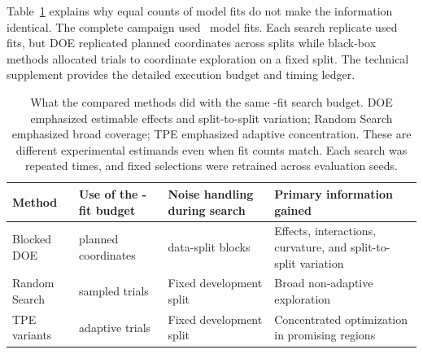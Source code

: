 \documentclass[12pt,a4paper]{article}
\begin{document}
Table~\ref{tab:methods} explains why equal counts of model fits do not make the information identical. The complete campaign used \numRevTotalFits\ model fits. Each search replicate used \numPubSearchFits{} fits, but DOE replicated planned coordinates across splits while black-box methods allocated trials to coordinate exploration on a fixed split. The technical supplement provides the detailed execution budget and timing ledger.
\begin{table}[H]
\centering
\small
\setlength{\tabcolsep}{5pt}
\renewcommand{\arraystretch}{1.3}
\begin{tabularx}{\textwidth}{@{}>{\raggedright\arraybackslash}p{}>{\raggedright\arraybackslash}p{}>{\raggedright\arraybackslash}p{}>{\raggedright\arraybackslash}X@{}}
\toprule
\textbf{Method} & \textbf{Use of the \numPubSearchFits{}-fit budget} & \textbf{Noise handling during search} & \textbf{Primary information gained} \\
\midrule
Blocked DOE & \numPubCoordinates{} planned coordinates & \numPubRepeatedBlocks{} data-split blocks & Effects, interactions, curvature, and split-to-split variation \\
Random Search & \numPubOptimizerTrials{} sampled trials & Fixed development split & Broad non-adaptive exploration \\
TPE variants & \numPubOptimizerTrials{} adaptive trials & Fixed development split & Concentrated optimization in promising regions \\
\bottomrule
\end{tabularx}
\caption{What the compared methods did with the same \numPubSearchFits{}-fit search budget. DOE emphasized estimable effects and split-to-split variation; Random Search emphasized broad coverage; TPE emphasized adaptive concentration. These are different experimental estimands even when fit counts match. Each search was repeated \numPubSearchReplicates{} times, and fixed selections were retrained across \numPubEvalSeeds{} evaluation seeds.}
\label{tab:methods}
\end{table}
\end{document}
